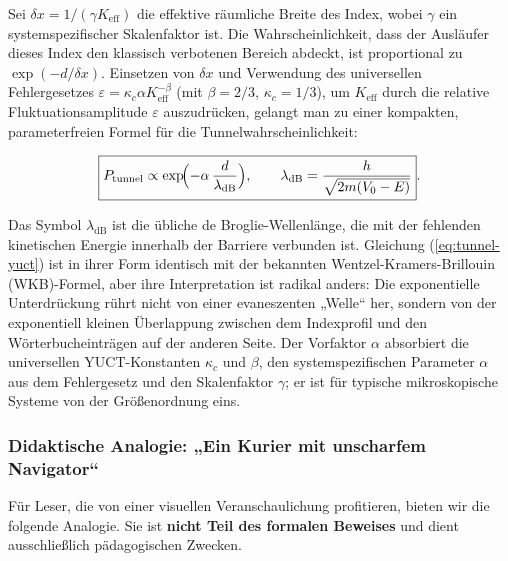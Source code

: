 \documentclass[12pt,a4paper]{article}
\theoremstyle{remark}
\begin{document}
	Sei $\delta x = 1/(\gamma K_{\mathrm{eff}})$ die effektive räumliche Breite des Index, wobei $\gamma$ ein systemspezifischer Skalenfaktor ist. Die Wahrscheinlichkeit, dass der Ausläufer dieses Index den klassisch verbotenen Bereich abdeckt, ist proportional zu $\exp(-d / \delta x)$. Einsetzen von $\delta x$ und Verwendung des universellen Fehlergesetzes $\varepsilon = \kappa_c \alpha K_{\mathrm{eff}}^{-\beta}$ (mit $\beta=2/3$, $\kappa_c=1/3$), um $K_{\mathrm{eff}}$ durch die relative Fluktuationsamplitude $\varepsilon$ auszudrücken, gelangt man zu einer kompakten, parameterfreien Formel für die Tunnelwahrscheinlichkeit:
	
	\begin{equation}
		\boxed{ P_{\mathrm{tunnel}} \propto \exp\!\Bigl( -\alpha \,
			\frac{d}{\lambda_{\mathrm{dB}}} \Bigr),
			\qquad
			\lambda_{\mathrm{dB}} = \frac{h}{\sqrt{2m(V_0-E)}} }.
		\label{eq:tunnel-yuct}
	\end{equation}
	
	Das Symbol $\lambda_{\mathrm{dB}}$ ist die übliche de Broglie-Wellenlänge, die mit der fehlenden kinetischen Energie innerhalb der Barriere verbunden ist. Gleichung (\ref{eq:tunnel-yuct}) ist in ihrer Form identisch mit der bekannten Wentzel-Kramers-Brillouin (WKB)-Formel, aber ihre Interpretation ist radikal anders: Die exponentielle Unterdrückung rührt nicht von einer evaneszenten „Welle“ her, sondern von der exponentiell kleinen Überlappung zwischen dem Indexprofil und den Wörterbucheinträgen auf der anderen Seite. Der Vorfaktor $\alpha$ absorbiert die universellen YUCT-Konstanten $\kappa_c$ und $\beta$, den systemspezifischen Parameter $\alpha$ aus dem Fehlergesetz und den Skalenfaktor $\gamma$; er ist für typische mikroskopische Systeme von der Größenordnung eins.
	
	\subsubsection{Didaktische Analogie: „Ein Kurier mit unscharfem Navigator“}
	
	Für Leser, die von einer visuellen Veranschaulichung profitieren, bieten wir die folgende Analogie. Sie ist \textbf{nicht Teil des formalen Beweises} und dient ausschließlich pädagogischen Zwecken.
	
	\medskip
	\medskip
	
\end{document}
